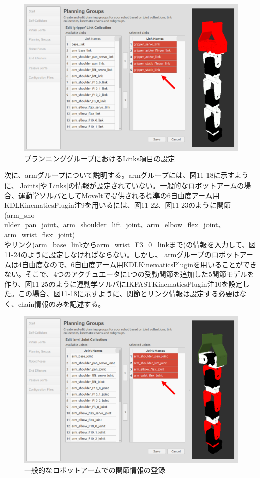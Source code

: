 \begin{figure}[htp]
  \centering
  \includegraphics[width=12cm]{pictures/chapter11/pic_11_21.png}
  \caption{プランニンググループにおけるLinks項目の設定}
\end{figure}

次に、armグループについて説明する。armグループには、図11-18に示すように、[Joints]や[Links]の情報が設定されていない。一般的なロボットアームの場合、運動学ソルバとしてMoveItで提供される標準の6自由度アーム用KDLKinematicsPlugin注9を用いるには、図11-22、図11-23のように関節(arm\_sho\\ulder\_pan\_joint、arm\_shoulder\_lift\_joint、arm\_elbow\_flex\_joint、arm\_wrist\_flsx\_joint)\\やリンク(arm\_base\_linkからarm\_wrist\_F3\_0\_linkまで)の情報を入力して、図11-24のように設定しなければならない。しかし、 armグループのロボットアームは4自由度なので、6自由度アーム用KDLKinematicsPluginを用いることができない。そこで、4つのアクチュエータに1つの受動関節を追加した5関節モデルを作り、図11-25のように運動学ソルバにIKFASTKinematicsPlugin注10を設定した。この場合、図11-18に示すように、関節とリンク情報は設定する必要はなく、chain情報のみを記述する。

\begin{figure}[htp]
  \centering
  \includegraphics[width=12cm]{pictures/chapter11/pic_11_22.png}
  \caption{一般的なロボットアームでの関節情報の登録}
\end{figure}

